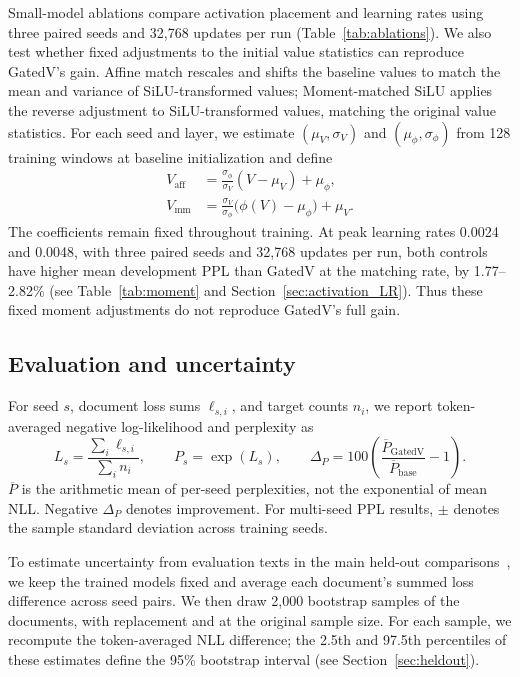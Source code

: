 \documentclass[11pt,a4paper]{article}
\begin{document}
Small-model ablations compare activation placement and learning rates using three paired seeds and 32,768 updates per run (Table~\ref{tab:ablations}). We also test whether fixed adjustments to the initial value statistics can reproduce GatedV's gain. Affine match rescales and shifts the baseline values to match the mean and variance of SiLU-transformed values; Moment-matched SiLU applies the reverse adjustment to SiLU-transformed values, matching the original value statistics. For each seed and layer, we estimate $(\mu_V,\sigma_V)$ and $(\mu_\phi,\sigma_\phi)$ from 128 training windows at baseline initialization and define
\begin{align}
 V_{\mathrm{aff}}&=\frac{\sigma_\phi}{\sigma_V}(V-\mu_V)+\mu_\phi,\\
 V_{\mathrm{mm}}&=\frac{\sigma_V}{\sigma_\phi}\big(\phi(V)-\mu_\phi\big)+\mu_V.
 \label{eq:controls}
\end{align}
The coefficients remain fixed throughout training. At peak learning rates 0.0024 and 0.0048, with three paired seeds and 32,768 updates per run, both controls have higher mean development PPL than GatedV at the matching rate, by 1.77--2.82\% (see Table~\ref{tab:moment} and Section~\ref{sec:activation_LR}). Thus these fixed moment adjustments do not reproduce GatedV's full gain.

\subsection{Evaluation and uncertainty}
For seed $s$, document loss sums $\ell_{s,i}$, and target counts $n_i$, we report token-averaged negative log-likelihood and perplexity as
\begin{equation}
 L_s=\frac{\sum_i\ell_{s,i}}{\sum_i n_i},\qquad P_s=\exp(L_s),\qquad
 \Delta_P=100\left(\frac{\overline P_{\mathrm{GatedV}}}{\overline P_{\mathrm{base}}}-1\right).
 \label{eq:pplchange}
\end{equation}
$\overline P$ is the arithmetic mean of per-seed perplexities, not the exponential of mean NLL. Negative $\Delta_P$ denotes improvement. For multi-seed PPL results, $\pm$ denotes the sample standard deviation across training seeds.

To estimate uncertainty from evaluation texts in the main held-out comparisons~\citep{benchvariance,statsguide}, we keep the trained models fixed and average each document's summed loss difference across seed pairs. We then draw 2,000 bootstrap samples of the documents, with replacement and at the original sample size. For each sample, we recompute the token-averaged NLL difference; the 2.5th and 97.5th percentiles of these estimates define the 95\% bootstrap interval (see Section~\ref{sec:heldout}).
\end{document}
